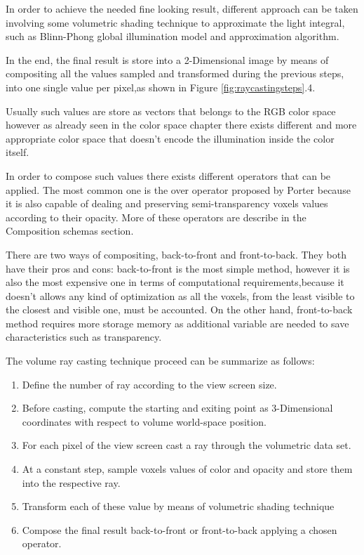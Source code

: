 \documentclass[12pt,a4paper]{extarticle}
\newcommand{\linespace}{\vspace{8pt}}
\begin{document}
In order to achieve the needed fine looking result, different approach can be taken involving some volumetric shading technique to approximate the light integral, such as Blinn-Phong global illumination model and approximation algorithm.
\linespace

In the end, the final result is store into a 2-Dimensional image by means of compositing all the values sampled and transformed during the previous steps, into one single value per pixel,as shown in Figure \ref{fig:raycastingsteps}.4.

Usually such values are store as vectors that belongs to the RGB color space%
however as already seen in the color space chapter there exists different and more appropriate color space that doesn't encode the illumination inside the color itself.
\linespace

In order to compose such values there exists different operators that can be applied. The most common one is the over operator proposed by Porter%
 because it is also capable of dealing and preserving semi-transparency voxels values according to their opacity. More of these operators are describe in the Composition schemas section.
\linespace

There are two ways of compositing, back-to-front and front-to-back. They both have their pros and cons: back-to-front is the most simple method, however it is also the most expensive one in terms of computational requirements,because it doesn't allows any kind of optimization as all the voxels, from the least visible to the closest and visible one, must be accounted.
On the other hand, front-to-back method requires more storage memory as additional variable are needed to save characteristics such as transparency.
\linespace

The volume ray casting technique proceed can be summarize as follows:
\begin{enumerate}
\item Define the number of ray according to the view screen size.
\item Before casting, compute the starting and exiting point as 3-Dimensional coordinates with respect to volume world-space position.
\item For each pixel of the view screen cast a ray through the volumetric data set.
\item At a constant step, sample voxels values of color and opacity and store them into the respective ray.
\item Transform each of these value by means of volumetric shading technique
\item Compose the final result back-to-front or front-to-back applying a chosen operator.
\end{enumerate}
\end{document}
